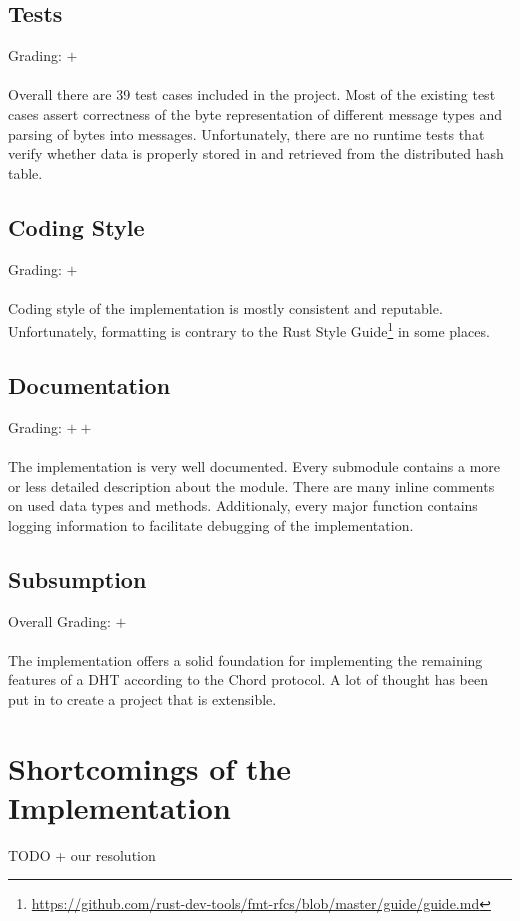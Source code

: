 \documentclass[a4paper, 11pt]{article}
\begin{document}
\subsection*{Tests}
Grading: $+$\\
\\
Overall there are 39 test cases included in the project.
Most of the existing test cases assert correctness of the byte representation of different message types and parsing of bytes into messages.
Unfortunately, there are no runtime tests that verify whether data is properly stored in and retrieved from the distributed hash table.


\subsection*{Coding Style}
Grading: $+$\\
\\
Coding style of the implementation is mostly consistent and reputable.
Unfortunately, formatting is contrary to the Rust Style Guide\footnote{\url{https://github.com/rust-dev-tools/fmt-rfcs/blob/master/guide/guide.md}} in some places.


\subsection*{Documentation}
Grading: $++$\\
\\
The implementation is very well documented.
Every submodule contains a more or less detailed description about the module.
There are many inline comments on used data types and methods.
Additionaly, every major function contains logging information to facilitate debugging of the implementation.


\subsection*{Subsumption}
Overall Grading: $+$\\
\\
The implementation offers a solid foundation for implementing the remaining features of a DHT according to the Chord protocol. 
A lot of thought has been put in to create a project that is extensible.

\section*{Shortcomings of the Implementation}
TODO + our resolution
\end{document}
